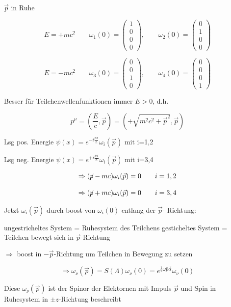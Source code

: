 \(\vec p\) in Ruhe

\[E = +mc^2\qquad \omega_1(0) = \begin{pmatrix} 1\\ 0 \\ 0\\ 0 \end{pmatrix},\qquad \omega_2(0) = \begin{pmatrix} 0\\ 1 \\ 0\\ 0 \end{pmatrix} \]

\[E = -mc^2\qquad \omega_3(0) = \begin{pmatrix} 0\\ 0 \\ 1\\ 0 \end{pmatrix},\qquad  \omega_4(0) = \begin{pmatrix} 0\\ 0 \\ 0\\ 1 \end{pmatrix} \]

Besser für Teilchenwellenfunktionen immer \(E>0\), d.h.

\[p^\mu = (\frac{E}{c},\vec p) = (+\sqrt{m^2c^2+\vec p^2},\vec p)\]

Lsg pos. Energie \(\psi(x) = e^{-i\frac{px}{\hbar}}\omega_i(\vec p)\) mit i=1,2

Lsg neg. Energie \(\psi(x) = e^{+i\frac{px}{\hbar}}\omega_i(\vec p)\) mit i=3,4

\[\Rightarrow (\cancel p -mc) \omega_i(\vec p) = 0 \qquad i=1,2\]

\[\Rightarrow (\cancel p +mc) \omega_i(\vec p) = 0 \qquad i=3,4\]

Jetzt \(\omega_i(\vec p)\) durch boost von \(\omega_i(0)\) entlang der \(\vec p\)- Richtung:

ungestricheltes System = Ruhesystem des Teilchens
gesticheltes System = Teilchen bewegt sich in \(\vec p \)-Richtung

\(\Rightarrow \) boost in \(-\vec p\)-Richtung um Teilchen in Bewegung zu setzen

\[\Rightarrow \omega_\nu(\vec p) = S(\Lambda)\omega_\nu(0) = e^{\frac{1}{2}\omega\hat p\vec\alpha}\omega_\nu(0)  \]

Diese \(\omega_\nu(\vec p)\) ist der Spinor der Elektornen mit Impuls \(\vec p\) und Spin in Ruhesystem in \(\pm z\)-Richtung beschreibt

